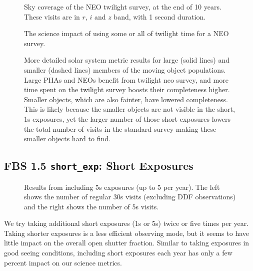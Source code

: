 \begin{figure}
\caption{Sky coverage of the NEO twilight survey, at the end of 10 years. These visits are in $r$, $i$ and $z$ band, with 1 second duration.}
\label{fig:sky_twilightneo}
\end{figure}

\begin{figure}
\caption{The science impact of using some or all of twilight time for a NEO survey.}\label{fig:neoradar}
\end{figure}

\begin{figure}
\caption{More detailed solar system metric results for large (solid lines) and smaller (dashed lines) members of the moving object populations. Large PHAs and NEOs benefit from twilight neo survey, and more time spent on the twilight survey boosts their completeness higher. Smaller objects, which are also fainter, have lowered completeness. This is likely because the smaller objects are not visible in the short, 1s exposures, yet the larger number of those short exposures lowers the total number of visits in the standard survey making these smaller objects hard to find.}
\label{fig:sscompleteness_twilight}
\end{figure}

\subsection{FBS 1.5 {\tt short\_exp}: Short Exposures}\label{ss:shortexp}

\begin{figure}
\caption{Results from including 5s exposures (up to 5 per year). The left shows the number of regular 30s visits (excluding DDF observations) and the right shows the number of 5s visits.}
\end{figure}


We try taking additional short exposures (1s or 5s) twice or five times per year. Taking shorter exposures is a less efficient observing mode, but it seems to have little impact on the overall open shutter fraction. Similar to taking exposures in good seeing conditions, including short exposures each year has only a few percent impact on our science metrics.

